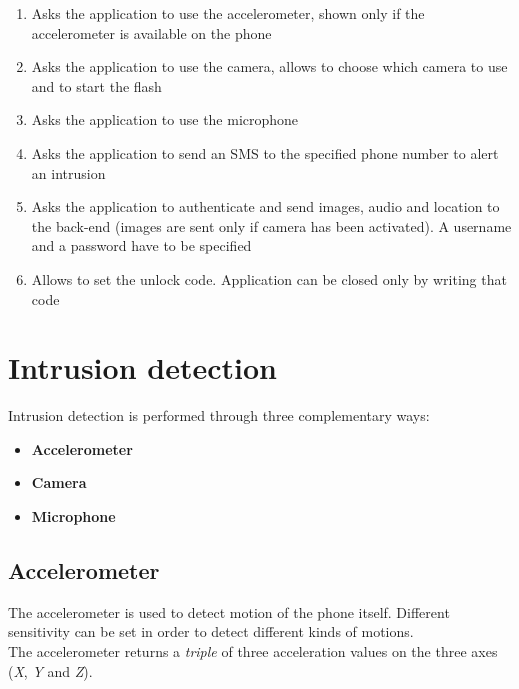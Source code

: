 \documentclass[conference, 11pt]{IEEEtran}
\begin{document}
\begin{enumerate}
	\item Asks the application to use the accelerometer, shown only if the accelerometer is available on the phone
	\item Asks the application to use the camera, allows to choose which camera to use and to start the flash
	\item Asks the application to use the microphone
	\item Asks the application to send an SMS to the specified phone number to alert an intrusion
	\item Asks the application to authenticate and send images, audio and location to the back-end (images are sent only if camera has been activated). A username and a password have to be specified
	\item Allows to set the unlock code. Application can be closed only by writing that code
\end{enumerate}

\section{\textbf{Intrusion detection}}
Intrusion detection is performed through three complementary ways:
\begin{itemize}
	\item \textbf{Accelerometer}
	\item \textbf{Camera}
	\item \textbf{Microphone}
\end{itemize}

\subsection{\textbf{Accelerometer}}
The accelerometer is used to detect motion of the phone itself. Different sensitivity can be set in order to detect different kinds of motions.\\
The accelerometer returns a \textit{triple} of three acceleration values on the three axes (\textit{X}, \textit{Y} and \textit{Z}). 
\end{document}
